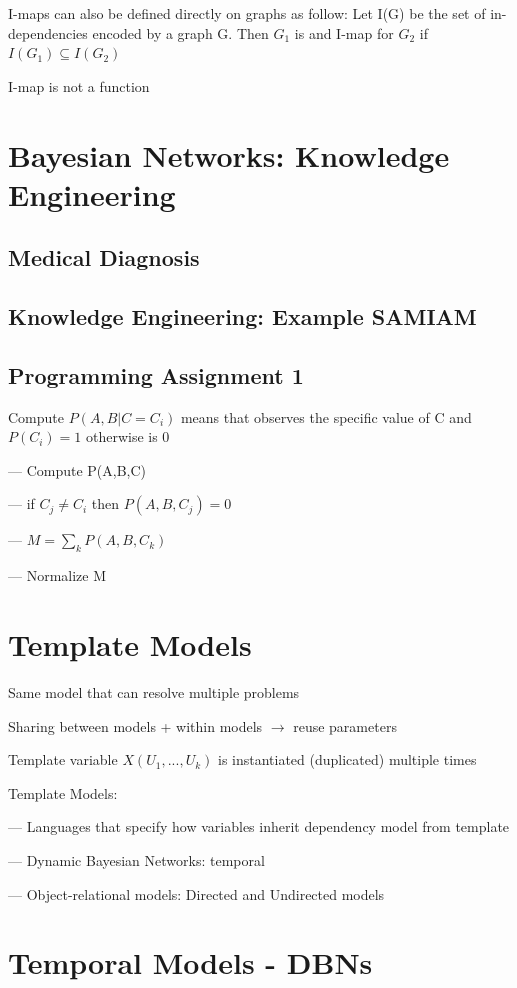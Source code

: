 \documentclass{book}
\begin{document}
I-maps can also be defined directly on graphs as follow: Let I(G) be the set of in-dependencies encoded by a graph G. Then $G_1$ is and I-map for $G_2$ if $I(G_1) \subseteq I(G_2)$

I-map is not a function

\section{Bayesian Networks: Knowledge Engineering}

\subsection{Medical Diagnosis}
\subsection{Knowledge Engineering: Example SAMIAM}

\subsection{Programming Assignment 1}

Compute $P(A,B|C=C_i)$ means that observes the specific value of C and $P(C_i) = 1$ otherwise is 0

--- Compute P(A,B,C)

--- if $C_j \neq C_i$ then  $P(A,B,C_j) = 0$

--- $M = \sum_{k} P(A,B,C_k)$

--- Normalize M


\section{Template Models}
Same model that can resolve multiple problems

Sharing between models + within models $\rightarrow$ reuse parameters

Template variable $X(U_1, ..., U_k)$ is instantiated (duplicated) multiple times

Template Models: 

--- Languages that specify how variables inherit dependency model from template

--- Dynamic Bayesian Networks: temporal

--- Object-relational models: Directed and Undirected models

\section{Temporal Models - DBNs}
\end{document}
